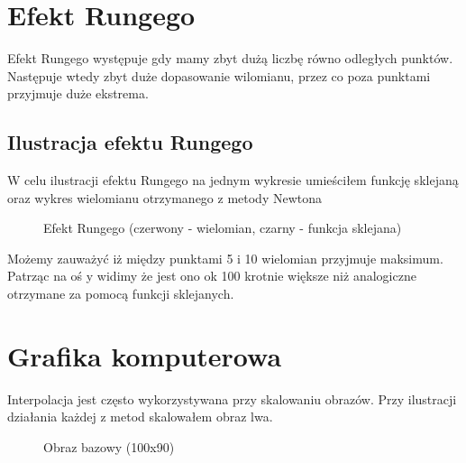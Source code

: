 \documentclass{article}
\begin{document}
    \pagebreak

    \section{Efekt Rungego}
    Efekt Rungego występuje gdy mamy zbyt dużą liczbę równo odległych punktów. Następuje wtedy zbyt duże dopasowanie wilomianu, 
    przez co poza punktami przyjmuje duże ekstrema.
    \subsection{Ilustracja efektu Rungego}
    W celu ilustracji efektu Rungego na jednym wykresie umieściłem funkcję sklejaną oraz wykres wielomianu otrzymanego z metody Newtona
    \begin{figure}[h]
        \caption{\label{fig:rungeg} Efekt Rungego (czerwony - wielomian, czarny - funkcja sklejana)}
    \end{figure}
    
    Możemy zauważyć iż między punktami 5 i 10 wielomian przyjmuje maksimum. Patrząc na oś y widimy że jest ono ok 100 krotnie większe niż analogiczne otrzymane
    za pomocą funkcji sklejanych.

    \section{Grafika komputerowa}
    Interpolacja jest często wykorzystywana przy skalowaniu obrazów. Przy ilustracji działania każdej z metod skalowałem obraz lwa.
    \begin{figure}[h]
        \caption{\label{fig:rungeg} Obraz bazowy (100x90)}
    \end{figure}
    
\end{document}

